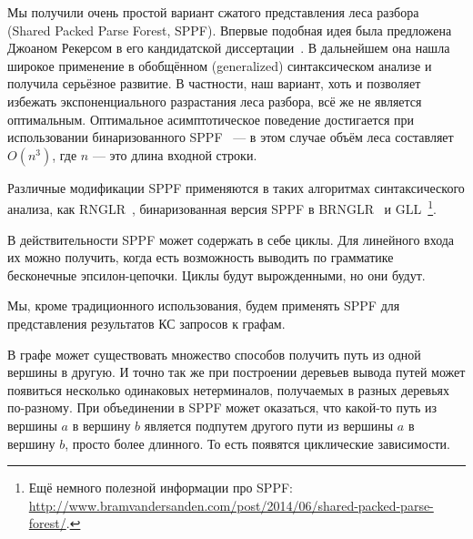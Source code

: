 \begin{example}
\begin{center}
{
}
\end{center}


\end{example}


Мы получили очень простой вариант сжатого представления леса разбора (Shared Packed Parse Forest, SPPF).
Впервые подобная идея была предложена Джоаном Рекерсом в его кандидатской диссертации~\cite{SPPF}.
В дальнейшем она нашла широкое применение в обобщённом (generalized) синтаксическом анализе и получила серьёзное развитие.
В частности, наш вариант, хоть и позволяет избежать экспоненциального разрастания леса разбора, всё же не является оптимальным.
Оптимальное асимптотическое поведение достигается при использовании бинаризованного SPPF~\cite{Billot:1989:SSF:981623.981641} --- в этом случае объём леса составляет $O(n^3)$, где $n$ --- это длина входной строки.

Различные модификации SPPF применяются в таких алгоритмах синтаксического анализа, как RNGLR~\cite{Scott:2006:RNG:1146809.1146810}, бинаризованная версия SPPF в BRNGLR~\cite{Scott:2007:BCT:1289813.1289815} и GLL~\cite{Scott:2010:GP:1860132.1860320,10.1007/978-3-662-46663-6_5}\footnote{Ещё немного полезной информации про SPPF: \url{http://www.bramvandersanden.com/post/2014/06/shared-packed-parse-forest/}.}.

В действительности SPPF может содержать в себе циклы. Для линейного входа их можно получить, когда есть возможность выводить по грамматике бесконечные эпсилон-цепочки. Циклы будут вырожденными, но они будут.

Мы, кроме традиционного использования, будем применять SPPF для представления результатов КС запросов к графам.

В графе может существовать множество способов получить путь из одной вершины в другую. И точно так же при построении деревьев вывода путей может появиться несколько одинаковых нетерминалов, получаемых в разных деревьях по-разному. При объединении в SPPF может оказаться, что какой-то путь из вершины $a$ в вершину $b$ является подпутем другого пути из вершины $a$ в вершину $b$, просто более длинного. То есть появятся циклические зависимости.

